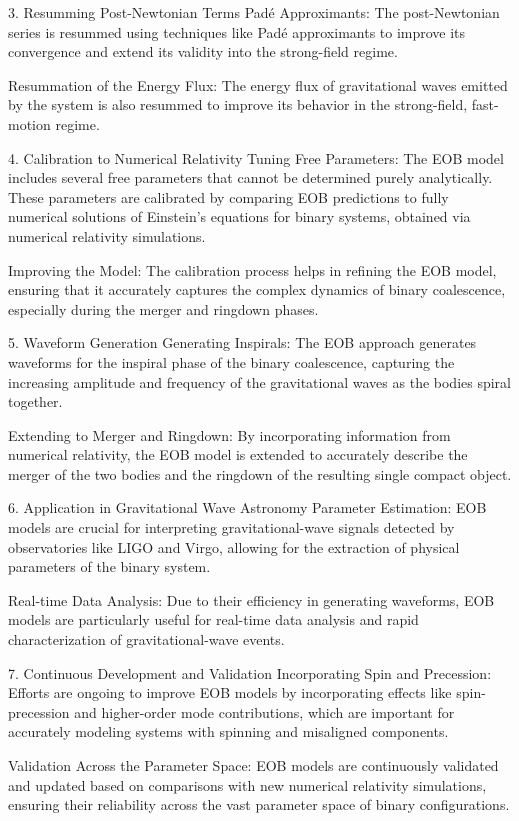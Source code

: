 3. Resumming Post-Newtonian Terms
    Padé Approximants: The post-Newtonian series is resummed using techniques like Padé approximants to improve its convergence and extend its validity into the strong-field regime.

    Resummation of the Energy Flux: The energy flux of gravitational waves emitted by the system is also resummed to improve its behavior in the strong-field, fast-motion regime.

4. Calibration to Numerical Relativity
    Tuning Free Parameters: The EOB model includes several free parameters that cannot be determined purely analytically. These parameters are calibrated by comparing EOB predictions to fully numerical solutions of Einstein’s equations for binary systems, obtained via numerical relativity simulations.

    Improving the Model: The calibration process helps in refining the EOB model, ensuring that it accurately captures the complex dynamics of binary coalescence, especially during the merger and ringdown phases.

5. Waveform Generation
    Generating Inspirals: The EOB approach generates waveforms for the inspiral phase of the binary coalescence, capturing the increasing amplitude and frequency of the gravitational waves as the bodies spiral together.

    Extending to Merger and Ringdown: By incorporating information from numerical relativity, the EOB model is extended to accurately describe the merger of the two bodies and the ringdown of the resulting single compact object.

6. Application in Gravitational Wave Astronomy
    Parameter Estimation: EOB models are crucial for interpreting gravitational-wave signals detected by observatories like LIGO and Virgo, allowing for the extraction of physical parameters of the binary system.

    Real-time Data Analysis: Due to their efficiency in generating waveforms, EOB models are particularly useful for real-time data analysis and rapid characterization of gravitational-wave events.

7. Continuous Development and Validation
    Incorporating Spin and Precession: Efforts are ongoing to improve EOB models by incorporating effects like spin-precession and higher-order mode contributions, which are important for accurately modeling systems with spinning and misaligned components.

    Validation Across the Parameter Space: EOB models are continuously validated and updated based on comparisons with new numerical relativity simulations, ensuring their reliability across the vast parameter space of binary configurations.


